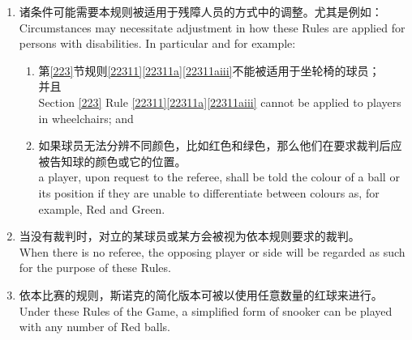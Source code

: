 \begin{enumerate}
    \item 诸条件可能需要本规则被适用于残障人员的方式中的调整。尤其是例如：\\
    Circumstances may necessitate adjustment in how these Rules are applied for persons with disabilities. In particular and for example:
    \begin{enumerate}
        \item 第\ref{223}节规则\ref{22311}\ref{22311a}\ref{22311aiii}不能被适用于坐轮椅的球员；\\并且\\
        Section \ref{223} Rule \ref{22311}\ref{22311a}\ref{22311aiii} cannot be applied to players in wheelchairs; and
        \item 如果球员无法分辨不同颜色，比如红色和绿色，那么他们在要求裁判后应被告知球的颜色或它的位置。\\
        a player, upon request to the referee, shall be told the colour of a ball or its position if they are unable to differentiate between colours as, for example, Red and Green.
    \end{enumerate}
    \item 当没有裁判时，对立的某球员或某方会被视为依本规则要求的裁判。\\
    When there is no referee, the opposing player or side will be regarded as such for the purpose of these Rules.
    \item 依本比赛的规则，斯诺克的简化版本可被以使用任意数量的红球来进行。\\
    Under these Rules of the Game, a simplified form of snooker can be played with any number of Red balls.
\end{enumerate}
